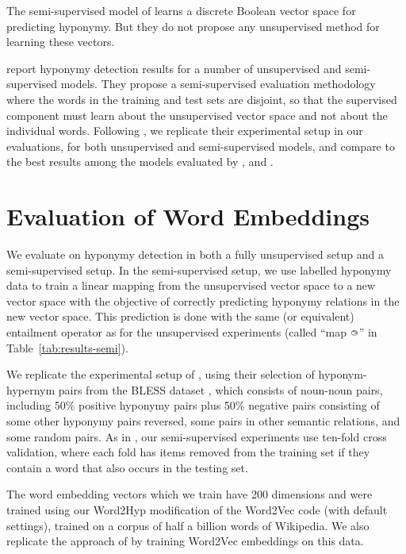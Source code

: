 \documentclass[11pt,a4paper]{article}
\newcommand{\bie}{{\raisebox{1.8pt}{\makebox[0pt][l]{\hspace{1.3pt}${\scriptscriptstyle >}$}${\scriptscriptstyle \bigcirc}$}}}
\begin{document}
The semi-supervised model of \citet{Kruszewski15}
learns a discrete Boolean vector space for predicting hyponymy.  But they
do not propose any unsupervised method for learning these vectors.


\citet{weeds2014learning} report hyponymy detection results for a number of
unsupervised and semi-supervised models.
They propose a semi-supervised evaluation methodology where the words in the
training and test sets are disjoint, so that the supervised component must
learn about the unsupervised vector space and not about the individual words.
Following \citet{Henderson16_acl}, we replicate their experimental setup in
our evaluations, for both unsupervised and semi-supervised models, and compare
to the best results among the models evaluated by \citet{weeds2014learning},
\citet{Shwartz17} and \citet{Henderson16_acl}.



\section{Evaluation of Word Embeddings}
\label{sec:results}

We evaluate on hyponymy detection in both a fully unsupervised setup and a
semi-supervised setup. 
In the semi-supervised setup, we use labelled hyponymy data to train a linear
mapping from the unsupervised vector space to a new vector space with the
objective of correctly predicting hyponymy relations in the new vector space.
This prediction is done with the same (or equivalent) entailment operator
as for the unsupervised experiments (called ``map $\bie$'' in
Table~\ref{tab:results-semi}).



We replicate the experimental setup of \citet{weeds2014learning},
using their selection of hyponym-hypernym pairs
from
the BLESS dataset \citep{bless-dataset}, which consists of noun-noun pairs,
including 50\% positive hyponymy pairs plus 50\% negative pairs consisting of
some other hyponymy pairs reversed, some pairs in other semantic relations,
and some random pairs.
As in \citep{weeds2014learning}, our semi-supervised experiments use ten-fold
cross validation, where each fold has items removed from the training set if
they contain a word that also occurs in the testing set.

The word embedding vectors which we train have 200 dimensions and were trained
using our Word2Hyp modification of the Word2Vec code (with default
settings), trained on a corpus of half a billion words of Wikipedia.
We also replicate the
approach of \citet{Henderson16_acl} by training Word2Vec embeddings on this data.
\end{document}

